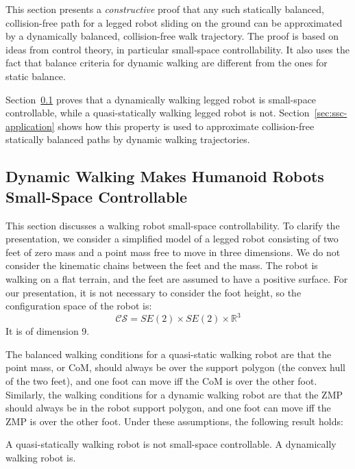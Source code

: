 This section presents a \textit{constructive} proof that any such
statically balanced, collision-free path for a legged robot sliding on
the ground can be approximated by a dynamically balanced,
collision-free walk trajectory.  The proof is based on ideas from
control theory, in particular small-space controllability. It also
uses the fact that balance criteria for dynamic walking are different
from the ones for static balance.

Section~\ref{sec:humanoid-ssc} proves that a dynamically walking
legged robot is small-space controllable, while a quasi-statically
walking legged robot is not. Section~\ref{sec:ssc-application} shows
how this property is used to approximate collision-free statically
balanced paths by dynamic walking trajectories.

\subsection{Dynamic Walking Makes Humanoid Robots Small-Space Controllable}
\label{sec:humanoid-ssc}

This section discusses a walking robot small-space controllability. To
clarify the presentation, we consider a simplified model of a legged
robot consisting of two feet of zero mass and a point mass free to
move in three dimensions.  We do not consider the kinematic chains
between the feet and the mass. The robot is walking on a flat terrain,
and the feet are assumed to have a positive surface. For our
presentation, it is not necessary to consider the foot height, so the
configuration space of the robot is:
\begin{equation}
  \mathcal{CS} = SE(2) \times SE(2) \times \mathbb{R}^3
\end{equation}
It is of dimension 9.

The balanced walking conditions for a quasi-static walking robot are
that the point mass, or CoM, should always be over the support polygon
(the convex hull of the two feet), and one foot can move iff the CoM
is over the other foot. Similarly, the walking conditions for a
dynamic walking robot are that the ZMP should always be in the robot
support polygon, and one foot can move iff the ZMP is over the other
foot. Under these assumptions, the following result holds:

\begin{theorem}
\label{thm:humanoid-ssc}
A quasi-statically walking robot is not small-space controllable. A
dynamically walking robot is.
\end{theorem}

